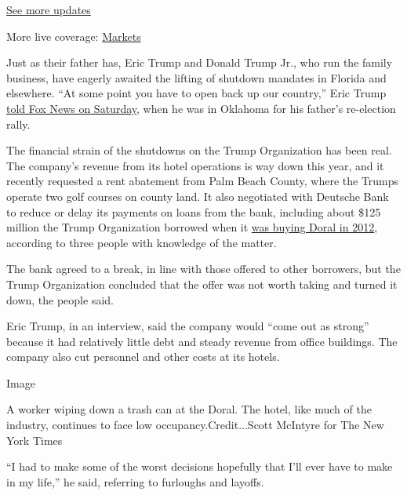 \href{https://www.nytimes3xbfgragh.onion/2020/09/11/world/covid-19-coronavirus.html?action=click\&pgtype=Article\&state=default\&region=MAIN_CONTENT_1\&context=storylines_live_updates}{See
more updates}

More live coverage:
\href{https://www.nytimes3xbfgragh.onion/live/2020/09/11/business/stock-market-today-coronavirus?action=click\&pgtype=Article\&state=default\&region=MAIN_CONTENT_1\&context=storylines_live_updates}{Markets}

Just as their father has, Eric Trump and Donald Trump Jr., who run the
family business, have eagerly awaited the lifting of shutdown mandates
in Florida and elsewhere. ``At some point you have to open back up our
country,'' Eric Trump
\href{https://www.msn.com/en-us/video/watch/eric-trump-on-tonights-tulsa-rally/vi-BB15LHTr}{told
Fox News on Saturday}, when he was in Oklahoma for his father's
re-election rally.

The financial strain of the shutdowns on the Trump Organization has been
real. The company's revenue from its hotel operations is way down this
year, and it recently requested a rent abatement from Palm Beach County,
where the Trumps operate two golf courses on county land. It also
negotiated with Deutsche Bank to reduce or delay its payments on loans
from the bank, including about \$125 million the Trump Organization
borrowed when it
\href{https://www.reuters.com/article/us-usa-florida-trump/trump-buys-miamis-doral-golf-resort-for-150-million-idUSTRE81R1C620120228\#:~:text=MIAMI\%20(Reuters)\%20\%2D\%20Real\%20estate,of\%20hotels\%20and\%20golf\%20resorts.}{was
buying Doral in 2012}, according to three people with knowledge of the
matter.

The bank agreed to a break, in line with those offered to other
borrowers, but the Trump Organization concluded that the offer was not
worth taking and turned it down, the people said.

Eric Trump, in an interview, said the company would ``come out as
strong'' because it had relatively little debt and steady revenue from
office buildings. The company also cut personnel and other costs at its
hotels.

Image

A worker wiping down a trash can at the Doral. The hotel, like much of
the industry, continues to face low occupancy.Credit...Scott McIntyre
for The New York Times

``I had to make some of the worst decisions hopefully that I'll ever
have to make in my life,'' he said, referring to furloughs and layoffs.

